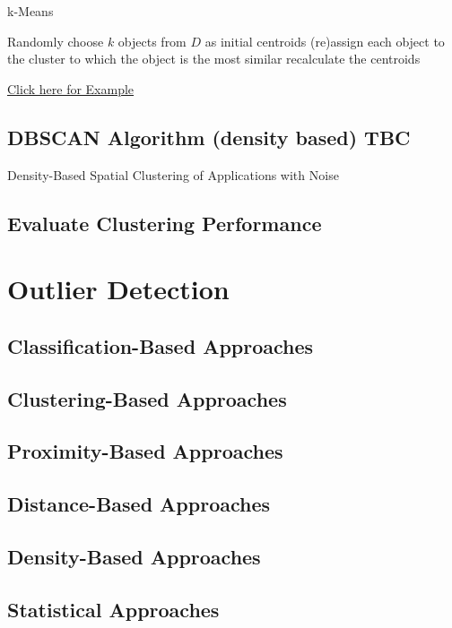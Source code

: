 \documentclass{article}
\begin{document}
                \begin{algorithm}
                    \caption{k-Means}
                    \begin{algorithmic}[1]

                            \State Randomly choose $k$ objects from $D$ as initial centroids
                            \Repeat
                                \State (re)assign each object to the cluster to which the object is the most similar
                                \State recalculate the centroids
                        \EndProcedure
                    \end{algorithmic}
                \end{algorithm}

                \begin{center}
                    \href{https://github.com/chris24s/COMP3605-Introduction-to-Data-Analytics-Cheat-Sheet/blob/master/Examples/2.%20Clustering/k-Means%20Example.pdf}{Click here for Example}
                \end{center}


            \newpage
            \subsection{DBSCAN Algorithm (density based) TBC}
                Density-Based Spatial Clustering of Applications with Noise




            \newpage
            \subsection{Evaluate Clustering Performance}


        \newpage
        \section{Outlier Detection}
            \subsection{Classification-Based Approaches}
            \subsection{Clustering-Based Approaches}
            \subsection{Proximity-Based Approaches}
            \subsection{Distance-Based Approaches}
            \subsection{Density-Based Approaches}
            \subsection{Statistical Approaches}
\end{document}
